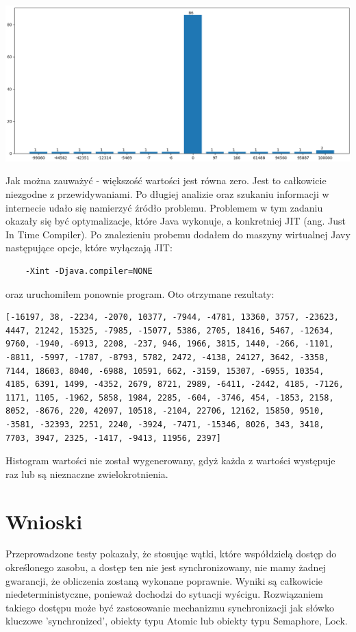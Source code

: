 \documentclass[12pt]{article}
\begin{document}
\begin{center}
\centering
    \includegraphics[width=\textwidth]{hist1.png}
\end{center}


Jak można zauważyć - większość wartości jest równa zero. Jest to całkowicie niezgodne z przewidywaniami. Po długiej analizie oraz szukaniu informacji w internecie udało się namierzyć źródło problemu. Problemem w tym zadaniu okazały się być optymalizacje, które Java wykonuje, a konkretniej JIT (ang. Just In Time Compiler). Po znalezieniu probemu dodałem do maszyny wirtualnej Javy następujące opcje, które wyłączają JIT:

\begin{verbatim}
    -Xint -Djava.compiler=NONE
\end{verbatim}
oraz uruchomiłem ponownie program. Oto otrzymane rezultaty:

\begin{verbatim}
[-16197, 38, -2234, -2070, 10377, -7944, -4781, 13360, 3757, -23623, 4447, 21242, 15325, -7985, -15077, 5386, 2705, 18416, 5467, -12634, 9760, -1940, -6913, 2208, -237, 946, 1966, 3815, 1440, -266, -1101, -8811, -5997, -1787, -8793, 5782, 2472, -4138, 24127, 3642, -3358, 7144, 18603, 8040, -6988, 10591, 662, -3159, 15307, -6955, 10354, 4185, 6391, 1499, -4352, 2679, 8721, 2989, -6411, -2442, 4185, -7126, 1171, 1105, -1962, 5858, 1984, 2285, -604, -3746, 454, -1853, 2158, 8052, -8676, 220, 42097, 10518, -2104, 22706, 12162, 15850, 9510, -3581, -32393, 2251, 2240, -3924, -7471, -15346, 8026, 343, 3418, 7703, 3947, 2325, -1417, -9413, 11956, 2397]
\end{verbatim}
Histogram wartości nie został wygenerowany, gdyż każda z wartości występuje raz lub są nieznaczne zwielokrotnienia.

\newpage
\section{Wnioski}
Przeprowadzone testy pokazały, że stosując wątki, które współdzielą dostęp do określonego zasobu, a dostęp ten nie jest synchronizowany, nie mamy żadnej gwarancji, że obliczenia zostaną wykonane poprawnie. Wyniki są całkowicie niedeterministyczne, ponieważ dochodzi do sytuacji wyścigu. Rozwiązaniem takiego dostępu może być zastosowanie mechanizmu synchronizacji jak słówko kluczowe 'synchronized', obiekty typu Atomic lub obiekty typu Semaphore, Lock.
\end{document}
